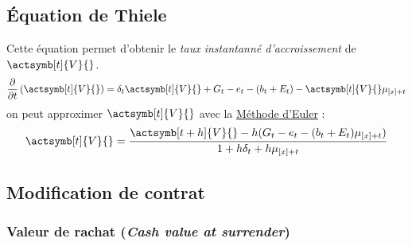 \documentclass[10pt, french]{article}
\begin{document}
\begin{multicols*}{2}
\subsection*{Équation de Thiele}
Cette équation permet d'obtenir le \emph{taux instantanné d'accroissement} de $\actsymb[t]{V}{}$.
\[\derivee{t} \left( \actsymb[t]{V}{} \right) =\delta_t \actsymb[t]{V}{} + G_t - e_t - (b_t + E_t) - \actsymb[t]{V}{} \mu_{[x] + t}  \]
on peut approximer $\actsymb[t]{V}{}$ avec la \underline{Méthode d'Euler} : 
\[\actsymb[t]{V}{} = \frac{\actsymb[t+h]{V}{} - h(G_t - e_t - (b_t + E_t)\mu_{[x] + t})}{1 + h \delta_t + h \mu_{[x] + t}}   \]

\subsection*{Modification de contrat}
\subsubsection*{Valeur de rachat (\emph{Cash value at surrender})}









\end{multicols*}
\end{document}
